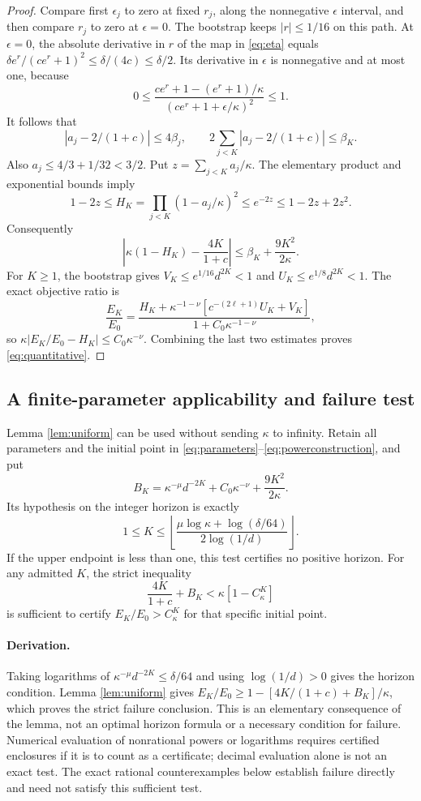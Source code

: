 \documentclass[11pt,a4paper]{article}
\theoremstyle{remark}
\newcommand{\Ck}{C_\kappa}
\begin{document}
\begin{proof}
Compare first $\epsilon_j$ to zero at fixed $r_j$, along the nonnegative $\epsilon$ interval, and then compare $r_j$ to zero at $\epsilon=0$. The bootstrap keeps $|r|\le1/16$ on this path. At $\epsilon=0$, the absolute derivative in $r$ of the map in \eqref{eq:eta} equals $\delta e^r/(ce^r+1)^2\le\delta/(4c)\le\delta/2$. Its derivative in $\epsilon$ is nonnegative and at most one, because
\[
 0\le\frac{ce^r+1-(e^r+1)/\kappa}
 {(ce^r+1+\epsilon/\kappa)^2}\le1.
\]
It follows that
\[
 |a_j-2/(1+c)|\le4\beta_j,\qquad
 2\sum_{j<K}|a_j-2/(1+c)|\le\beta_K.
\]
Also $a_j\le4/3+1/32<3/2$. Put $z=\sum_{j<K}a_j/\kappa$. The elementary product and exponential bounds imply
\[
 1-2z\le H_K=\prod_{j<K}(1-a_j/\kappa)^2
 \le e^{-2z}\le1-2z+2z^2.
\]
Consequently
\[
 \left|\kappa(1-H_K)-\frac{4K}{1+c}\right|
 \le\beta_K+\frac{9K^2}{2\kappa}.
\]
For $K\ge1$, the bootstrap gives $V_K\le e^{1/16}d^{2K}<1$ and $U_K\le e^{1/8}d^{2K}<1$. The exact objective ratio is
\[
 \frac{E_K}{E_0}
 =\frac{H_K+\kappa^{-1-\nu}[c^{-(2\ell+1)}U_K+V_K]}
 {1+C_0\kappa^{-1-\nu}},
\]
so $\kappa|E_K/E_0-H_K|\le C_0\kappa^{-\nu}$. Combining the last two estimates proves \eqref{eq:quantitative}.
\end{proof}

\subsection*{A finite-parameter applicability and failure test}
Lemma \ref{lem:uniform} can be used without sending $\kappa$ to infinity. Retain all parameters and the initial point in \eqref{eq:parameters}--\eqref{eq:powerconstruction}, and put
\[
 B_K=\kappa^{-\mu}d^{-2K}+C_0\kappa^{-\nu}+\frac{9K^2}{2\kappa}.
\]
Its hypothesis on the integer horizon is exactly
\[
 1\le K\le\left\lfloor
 \frac{\mu\log\kappa+\log(\delta/64)}{2\log(1/d)}
 \right\rfloor.
\]
If the upper endpoint is less than one, this test certifies no positive horizon. For any admitted $K$, the strict inequality
\[
 \frac{4K}{1+c}+B_K<\kappa\left[1-\Ck^K\right]
\]
is sufficient to certify $E_K/E_0>\Ck^K$ for that specific initial point.

\paragraph{Derivation.}
Taking logarithms of $\kappa^{-\mu}d^{-2K}\le\delta/64$ and using $\log(1/d)>0$ gives the horizon condition. Lemma \ref{lem:uniform} gives $E_K/E_0\ge1-[4K/(1+c)+B_K]/\kappa$, which proves the strict failure conclusion. This is an elementary consequence of the lemma, not an optimal horizon formula or a necessary condition for failure. Numerical evaluation of nonrational powers or logarithms requires certified enclosures if it is to count as a certificate; decimal evaluation alone is not an exact test. The exact rational counterexamples below establish failure directly and need not satisfy this sufficient test.
\end{document}
